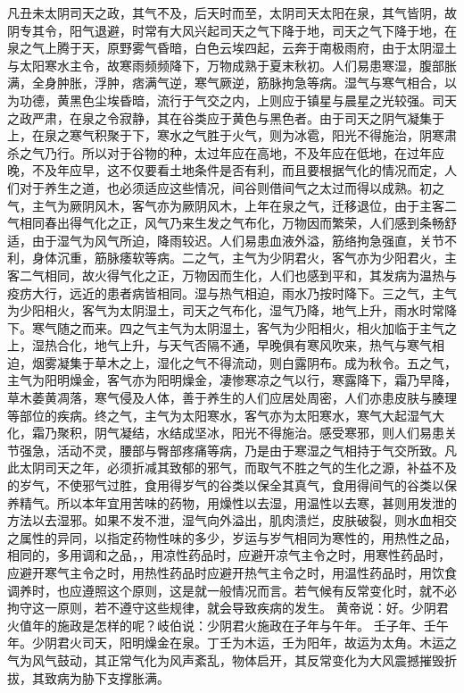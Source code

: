 \documentclass[a4paper,12pt,UTF8,twoside]{ctexbook}
\begin{document}
凡丑未太阴司天之政，其气不及，后天时而至，太阴司天太阳在泉，其气皆阴，故阴专其令，阳气退避，时常有大风兴起司天之气下降于地，司天之气下降于地，在泉之气上腾于天，原野雾气昏暗，白色云埃四起，云奔于南极雨府，由于太阴湿土与太阳寒水主令，故寒雨频频降下，万物成熟于夏末秋初。人们易患寒湿，腹部胀满，全身肿胀，浮肿，痞满气逆，寒气厥逆，筋脉拘急等病。湿气与寒气相合，以为功德，黄黑色尘埃昏暗，流行于气交之内，上则应于镇星与晨星之光较强。司天之政严肃，在泉之令寂静，其在谷类应于黄色与黑色者。由于司天之阴气凝集于上，在泉之寒气积聚于下，寒水之气胜于火气，则为冰雹，阳光不得施治，阴寒肃杀之气乃行。所以对于谷物的种，太过年应在高地，不及年应在低地，在过年应晚，不及年应早，这不仅要看土地条件是否有利，而且要根据气化的情况而定，人们对于养生之道，也必须适应这些情况，间谷则借间气之太过而得以成熟。初之气，主气为厥阴风木，客气亦为厥阴风木，上年在泉之气，迁移退位，由于主客二气相同春出得气化之正，风气乃来生发之气布化，万物因而繁荣，人们感到条畅舒适，由于湿气为风气所迫，降雨较迟。人们易患血液外溢，筋络拘急强直，关节不利，身体沉重，筋脉痿软等病。二之气，主气为少阴君火，客气亦为少阳君火，主客二气相同，故火得气化之正，万物因而生化，人们也感到平和，其发病为温热与疫疠大行，远近的患者病皆相同。湿与热气相迫，雨水乃按时降下。三之气，主气为少阳相火，客气为太阴湿土，司天之气布化，湿气乃降，地气上升，雨水时常降下。寒气随之而来。四之气主气为太阴湿土，客气为少阳相火，相火加临于主气之上，湿热合化，地气上升，与天气否隔不通，早晚俱有寒风吹来，热气与寒气相迫，烟雾凝集于草木之上，湿化之气不得流动，则白露阴布。成为秋令。五之气，主气为阳明燥金，客气亦为阳明燥金，凄惨寒凉之气以行，寒露降下，霜乃早降，草木萎黄凋落，寒气侵及人体，善于养生的人们应居处周密，人们亦患皮肤与腠理等部位的疾病。终之气，主气为太阳寒水，客气亦为太阳寒水，寒气大起湿气大化，霜乃聚积，阴气凝结，水结成坚冰，阳光不得施治。感受寒邪，则人们易患关节强急，活动不灵，腰部与臀部疼痛等病，乃是由于寒湿之气相持于气交所致。凡此太阴司天之年，必须折减其致郁的邪气，而取气不胜之气的生化之源，补益不及的岁气，不使邪气过胜，食用得岁气的谷类以保全其真气，食用得间气的谷类以保养精气。所以本年宜用苦味的药物，用燥性以去湿，用温性以去寒，甚则用发泄的方法以去湿邪。如果不发不泄，湿气向外溢出，肌肉溃烂，皮肤破裂，则水血相交之属性的异同，以指定药物性味的多少，岁运与岁气相同为寒性的，用热性之品，相同的，多用调和之品，，用凉性药品时，应避开凉气主令之时，用寒性药品时，应避开寒气主令之时，用热性药品时应避开热气主令之时，用温性药品时，用饮食调养时，也应遵照这个原则，这是就一般情况而言。若气候有反常变化时，就不必拘守这一原则，若不遵守这些规律，就会导致疾病的发生。
黄帝说：好。少阴君火值年的施政是怎样的呢？岐伯说：少阴君火施政在子年与午年。
壬子年、壬午年。少阴君火司天，阳明燥金在泉。丁壬为木运，壬为阳年，故运为太角。木运之气为风气鼓动，其正常气化为风声紊乱，物体启开，其反常变化为大风震撼摧毁折拔，其致病为胁下支撑胀满。
\end{document}
